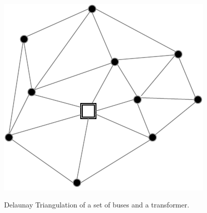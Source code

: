 \begin{figure}[h]
	\begin{centering}
		{\includegraphics[scale=0.7]{figures/background/tri.pdf}}
		\caption{Delaunay Triangulation of a set of buses and a transformer.}
		\label{fig:tri}
	\end{centering}
\end{figure}
